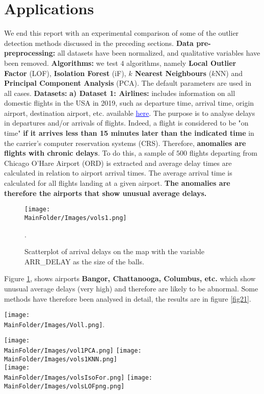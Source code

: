 \section{Applications}\label{Section:6}
We end this report with  an experimental comparison of some of the outlier detection methods discussed in the preceding sections. 
\newl \textbf{Data pre-preprocessing:} all datasets have been normalized, and qualitative variables have been removed.
\newl \textbf{Algorithms:} we test $4$ algorithms, namely  \textbf{Local Outlier Factor}  (LOF), \textbf{Isolation Forest} (iF), \textbf{$k$ Nearest Neighbours} ($k$NN) and \textbf{Principal Component Analysis} (PCA). The default parameters are used in all cases.  \newl
\textbf{Datasets:}
\noindent \textbf{a) Dataset 1: Airlines:} includes information on all domestic flights in the USA in 2019, such as departure time, arrival time, origin airport, destination airport, etc. available  \href{https://www.transtats.bts.gov/DL_SelectFields.asp?Table_ID=}{\textcolor{blue}{\underline{here}}}. The purpose is to analyse delays in departures and/or arrivals of flights. Indeed, a flight is considered to be "on time" \textbf{if it arrives less than 15 minutes later than the indicated time} in the carrier's computer reservation systems (CRS). Therefore, \textbf{anomalies are flights with chronic delays}. To do this, a sample of $500$ flights departing from Chicago O'Hare Airport (ORD) is extracted and average delay times are calculated in relation to airport arrival times. The average arrival time is calculated for all flights landing at a given airport.\textbf{ The anomalies are therefore the airports that show unusual average delays.}
\begin{figure}
    \centering
    \texttt{[image: \\MainFolder/Images/vols1.png]}
    \caption{Scatterplot of arrival delays on the map with the variable ARR\_DELAY as the size of the balls.}%
    \label{fig20}.
\end{figure}
\noindent Figure \ref{fig20}, shows airports \textbf{Bangor, Chattanooga, Columbus, etc.} which show unusual average delays (very high) and therefore are likely to be abnormal. Some methods have therefore been analysed in detail, the results are in figure \ref{fig21}.\newl
\begin{figure*}[ht]
    \centering
     \texttt{[image: \\MainFolder/Images/Voll.png]}\label{fig02}.
    \caption{Airports detected as outliers by PCA, KNN, Isolation Forest and LOF.}%
    \texttt{[image: \\MainFolder/Images/vol1PCA.png]}
    \texttt{[image: \\MainFolder/Images/vols1KNN.png]}\\
    \texttt{[image: \\MainFolder/Images/volsIsoFor.png]}
    \texttt{[image: \\MainFolder/Images/volsLOFpng.png]}
    \caption{Airports detected as outliers by PCA (top left), KNN (top right), Isolation Forest (bottom left) and LOF (bottom right)}%
    \label{fig21}
\end{figure*}
